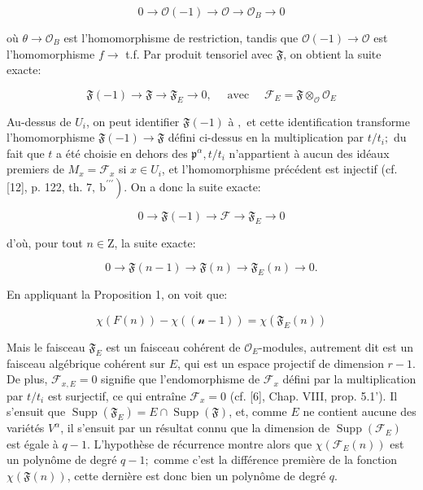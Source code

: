 $$
0 \rightarrow \mathcal{O}(-1) \rightarrow \mathcal{O} \rightarrow \mathcal{O}_{B} \rightarrow 0
$$

où $\theta \rightarrow \mathcal{O}_{B}$ est l'homomorphisme de restriction, tandis que $\mathcal{O}(-1) \rightarrow \mathcal{O}$ est l'homomorphisme $f \rightarrow$ t.f. Par produit tensoriel avec $\mathfrak{F}$, on obtient la suite exacte:

$$
\mathfrak{F}(-1) \rightarrow \mathfrak{F} \rightarrow \mathfrak{F}_{E} \rightarrow 0, \quad \text { avec } \quad \mathcal{F}_{E}=\mathfrak{F} \otimes_{\mathcal{O}} \mathcal{O}_{E}
$$

Au-dessus de $U_{i}$, on peut identifier $\mathfrak{F}(-1)$ à $\mathfrak{,}$ et cette identification transforme l'homomorphisme $\mathfrak{F}(-1) \rightarrow \mathfrak{F}$ défini ci-dessus en la multiplication par $t / t_{i} ;$ du fait que $t$ a été choisie en dehors des $\mathfrak{p}^{\alpha}, t / t_{i}$ n'appartient à aucun des idéaux premiers de $M_{x}=\mathscr{F}_{x}$ si $x \in U_{i}$, et l'homomorphisme précédent est injectif (cf. [12], p. 122, th. $\left.7, \mathrm{~b}^{\prime \prime \prime}\right)$. On a donc la suite exacte:

$$
0 \rightarrow \mathfrak{F}(-1) \rightarrow \mathcal{F} \rightarrow \mathfrak{F}_{E} \rightarrow 0
$$

d'où, pour tout $n \in \mathrm{Z}$, la suite exacte:

$$
0 \rightarrow \mathfrak{F}(n-1) \rightarrow \mathfrak{F}(n) \rightarrow \mathfrak{F}_{E}(n) \rightarrow 0 .
$$

En appliquant la Proposition 1, on voit que:

$$
\chi(F(n))-\chi(\mathscr{( n - 1 )})=\chi\left(\mathfrak{F}_{E}(n)\right)
$$

Mais le faisceau $\mathfrak{F}_{E}$ est un faisceau cohérent de $\mathcal{O}_{E}$-modules, autrement dit est un faisceau algébrique cohérent sur $E$, qui est un espace projectif de dimension $r-1$. De plus, $\mathscr{F}_{x, E}=0$ signifie que l'endomorphisme de $\mathcal{F}_{x}$ défini par la multiplication par $t / t_{i}$ est surjectif, ce qui entraîne $\mathcal{F}_{x}=0$ (cf. [6], Chap. VIII, prop. 5.1'). Il s'ensuit que $\operatorname{Supp}\left(\mathfrak{F}_{E}\right)=E \cap \operatorname{Supp}(\mathfrak{F})$, et, comme $E$ ne contient aucune des variétés $V^{\alpha}$, il s'ensuit par un résultat connu que la dimension de $\operatorname{Supp}\left(\mathscr{F}_{E}\right)$ est égale à $q-1$. L'hypothèse de récurrence montre alors que $\chi\left(\mathscr{F}_{E}(n)\right)$ est un polynôme de degré $q-1 ;$ comme c'est la différence première de la fonction $\chi(\mathfrak{F}(n))$, cette dernière est donc bien un polynôme de degré $q$.

